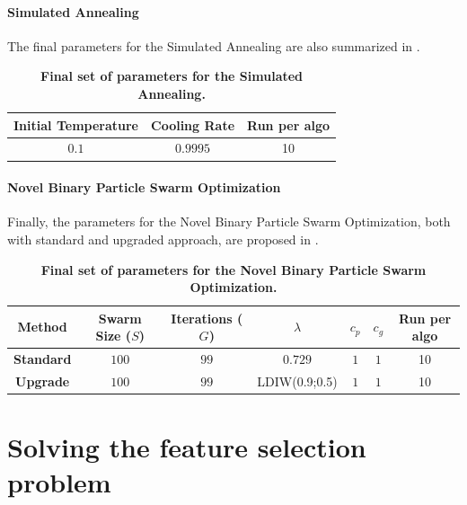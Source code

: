 \documentclass[12pt, openany]{article}
\begin{document}
\paragraph{Simulated Annealing} The final parameters for the Simulated Annealing are also summarized in .

\begin{table}[H]
    \centering
    \renewcommand{\arraystretch}{1.5}
  
    \begin{tabular}{|c|c|c|}
        \hline 
        \textbf{Initial Temperature} & \textbf{Cooling Rate} & \textbf{Run per algo} \\ \hline

        $0.1$ & $0.9995$ & 10 \\
        \hline
    \end{tabular}
    
    \caption{\textbf{Final set of parameters for the Simulated Annealing.}}
    \label{tab:final_parameters_SA}
\end{table}

\paragraph{Novel Binary Particle Swarm Optimization} Finally, the parameters for the Novel Binary Particle Swarm Optimization, both with standard and upgraded approach, are proposed in .

\begin{table}[H]
    \centering
    \renewcommand{\arraystretch}{1.5}
    \begin{tabular}{|c|c|c|c|c|c|c|}
        \hline 
        \textbf{Method} & \textbf{Swarm Size ($S$)} & \textbf{Iterations ($G$)} & $\lambda$ & $c_p$ & $c_g$ & \textbf{Run per algo} \\ \hline

        \textbf{Standard} & $100$ & $99$ & $0.729$ & $1$ & $1$ & 10 \\ \hdashline
        \textbf{Upgrade} & $100$ & $99$ & LDIW(0.9;0.5) & $1$ & $1$ & 10 \\ 
        \hline
    \end{tabular}
    \caption{\textbf{Final set of parameters for the Novel Binary Particle Swarm Optimization.}}
    \label{tab:final_parameters_NBPSO}
\end{table}

\section{Solving the feature selection problem}\label{sec:results_analysis}
\end{document}
